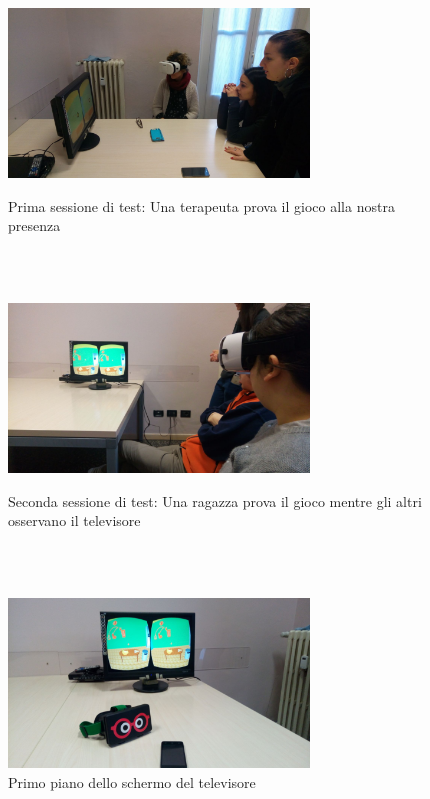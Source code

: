 \begin{figure}
 \begin{minipage}[c]{\columnwidth}
   \centering
   \includegraphics[width=8cm]{Images/terap}
   \caption{Prima sessione di test: Una terapeuta prova il gioco alla nostra presenza}
   \label{fig:test1}
 \end{minipage}
 \ \hspace{8mm} \hspace{8mm} \\\
 
 \begin{minipage}[c]{\columnwidth}
  \centering
   \includegraphics[width=8cm]{Images/raga}
   \caption{Seconda sessione di test: Una ragazza prova il gioco mentre gli altri osservano il televisore}
   \label{fig:test2}
 \end{minipage}
 \ \hspace{8mm} \hspace{8mm} \\\
 
 \begin{minipage}[c]{\columnwidth}
  \centering
   \includegraphics[width=8cm]{Images/strumenti}
   \caption{Primo piano dello schermo del televisore}
   \label{fig:tele}
 \end{minipage}
\end{figure}
\clearpage

